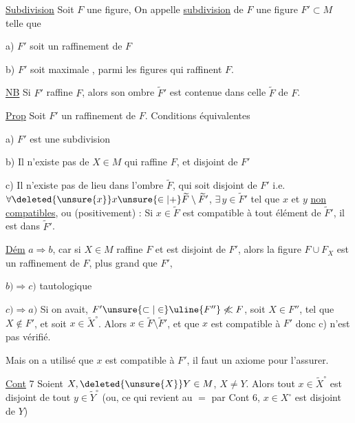 \uline{Subdivision} Soit $F$  une figure,  On appelle \uline{subdivision} de $F$ une figure $F'\subset M$ telle que

a) $F'$ soit un raffinement de $F$

b) $F'$ soit maximale , parmi les  figures qui raffinent $F$.

\uline{NB} Si $F'$ raffine $F$, alors son ombre $\widetilde F'$ est contenue dans celle $\widetilde F$ de $F$.

\uline{Prop} Soit $F'$ un raffinement de $F$. Conditions équivalentes

a) $F'$ est une subdivision

b) Il n'existe pas de $X\in M$ qui raffine $F$, et disjoint de $F'$

c)  Il n'existe pas de lieu dans l'ombre $\widetilde F$, qui soit disjoint de $F'$ i.e.  $\forall\deleted{\unsure{x}}x\unsure{\in|+}\widetilde F\setminus\widetilde F'$, $\exists\,y\in\widetilde F'$ tel que $x$ et $y$ \uline{non compatibles}, ou (positivement) : Si $x\in\widetilde F$ est compatible à tout élément de $\widetilde F'$, il est dans $\widetilde F'$.

\uline{Dém} $a\Longrightarrow b$, car si $X\in M$ raffine $F$ et est disjoint de $F'$, alors la figure $F\cup F_X$ est un raffinement de $F$,  plus grand que $F'$,

$b)\Longrightarrow c)$ tautologique

$c)\Longrightarrow a)$ Si on avait, $F'\unsure{\subset|\in} \uline{F''}\not\ll F$, soit $X\in F''$, tel que $X\notin F'$, et soit $x\in\widetilde X^\circ$. Alors $x\in\widetilde F\setminus\widetilde F'$, et  que $x$ est compatible à $F'$ donc c) n'est pas vérifié.

Mais on a utilisé que $x$ est compatible à $F'$, il faut un axiome pour l'assurer.

\uline{Cont} 7 Soient $X,\deleted{\unsure{X}}Y\in M$,  $X\ne Y$.  Alors tout $x\in\widetilde X^\circ$ est disjoint de tout $y\in\widetilde Y^\circ$ (ou, ce qui revient au $=$ par Cont 6,  $x\in X^\circ$ est disjoint de $Y$)

